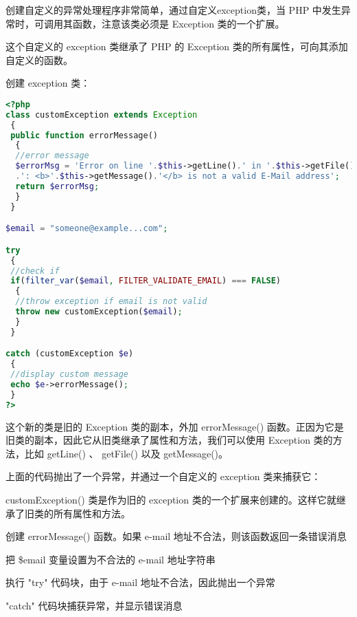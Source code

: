 创建自定义的异常处理程序非常简单，通过自定义exception类，当 PHP 中发生异常时，可调用其函数，注意该类必须是 Exception 类的一个扩展。


这个自定义的 exception 类继承了 PHP 的 Exception 类的所有属性，可向其添加自定义的函数。


\begin{compactenum}
\item 创建 exception 类：

\begin{lstlisting}[language=PHP]
<?php
class customException extends Exception
 {
 public function errorMessage()
  {
  //error message
  $errorMsg = 'Error on line '.$this->getLine().' in '.$this->getFile()
  .': <b>'.$this->getMessage().'</b> is not a valid E-Mail address';
  return $errorMsg;
  }
 }

$email = "someone@example...com";

try
 {
 //check if 
 if(filter_var($email, FILTER_VALIDATE_EMAIL) === FALSE)
  {
  //throw exception if email is not valid
  throw new customException($email);
  }
 }

catch (customException $e)
 {
 //display custom message
 echo $e->errorMessage();
 }
?>
\end{lstlisting}


这个新的类是旧的 Exception 类的副本，外加 errorMessage() 函数。正因为它是旧类的副本，因此它从旧类继承了属性和方法，我们可以使用 Exception 类的方法，比如 getLine() 、 getFile() 以及 getMessage()。

\item 上面的代码抛出了一个异常，并通过一个自定义的 exception 类来捕获它：

\begin{compactenum}
\item customException() 类是作为旧的 exception 类的一个扩展来创建的。这样它就继承了旧类的所有属性和方法。
\item 创建 errorMessage() 函数。如果 e-mail 地址不合法，则该函数返回一条错误消息
\item 把 \$email 变量设置为不合法的 e-mail 地址字符串
\item 执行 "try" 代码块，由于 e-mail 地址不合法，因此抛出一个异常
\item "catch" 代码块捕获异常，并显示错误消息
\end{compactenum}




\end{compactenum}



